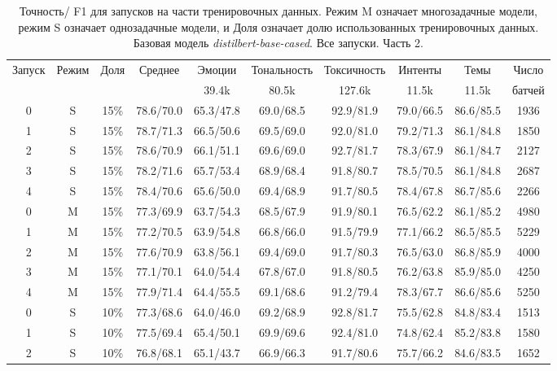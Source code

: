 \begin{table*}
\caption{Точность/ F1 для запусков на части тренировочных данных.  Режим M означает многозадачные модели, режим S означает однозадачные модели, и Доля означает долю использованных тренировочных данных. Базовая модель \textit{distilbert-base-cased}. Все запуски. Часть 2. }%
\label{appendix:model_results2}
\begin{tabular}{|c|c|c||c|c|c|c|c|c||c|} \hline
 \multirow{2}{*}{Запуск} & \multirow{2}{*}{Режим} &  \multirow{2}{*}{Доля} &\multirow{2}{*}{Среднее} & Эмоции & Тональность & Токсичность & Интенты & Темы & Число \\
& & & & 39.4k & 80.5k & 127.6k & 11.5k & 11.5k & батчей \\ \hline \hline
0 & S & 15\% & 78.6/70.0 & 65.3/47.8 & 69.0/68.5 & 92.9/81.9 & 79.0/66.5 & 86.6/85.5 & 1936 \\ \hline
1 & S & 15\% & 78.7/71.3 & 66.5/50.6 & 69.5/69.0 & 92.0/81.0 & 79.2/71.3 & 86.1/84.8 & 1850 \\ \hline
2 & S & 15\% & 78.6/70.9 & 66.1/51.1 & 69.6/69.0 & 92.7/81.7 & 78.3/67.9 & 86.1/84.7 & 2127 \\ \hline
3 & S & 15\% & 78.2/71.6 & 65.7/53.4 & 68.9/68.4 & 91.8/80.7 & 78.5/70.5 & 86.1/84.8 & 2687 \\ \hline
4 & S & 15\% & 78.4/70.6 & 65.6/50.0 & 69.4/68.9 & 91.7/80.5 & 78.4/67.8 & 86.7/85.6 & 2266 \\ \hline
0 & M & 15\% & 77.3/69.9 & 63.7/54.3 & 68.5/67.9 & 91.9/80.1 & 76.5/62.2 & 86.1/85.2 & 4980 \\ \hline
1 & M & 15\% & 77.2/70.5 & 63.9/54.8 & 66.8/66.0 & 91.5/79.9 & 77.1/66.2 & 86.5/85.5 & 5229 \\ \hline
2 & M & 15\% & 77.6/70.9 & 63.8/56.1 & 69.4/69.0 & 91.7/80.3 & 76.5/63.0 & 86.8/85.9 & 4000 \\ \hline
3 & M & 15\% & 77.1/70.1 & 64.0/54.4 & 67.8/67.0 & 91.8/80.5 & 76.2/63.8 & 85.9/85.0 & 4250 \\ \hline
4 & M & 15\% & 77.9/71.4 & 64.4/55.5 & 69.1/68.6 & 91.2/79.4 & 78.3/67.7 & 86.6/85.6 & 5250 \\ \hline
0 & S & 10\% & 77.3/68.6 & 64.0/46.0 & 69.2/68.9 & 92.8/81.7 & 75.5/62.8 & 84.8/83.4 & 1513 \\ \hline
1 & S & 10\% & 77.5/69.4 & 65.4/50.1 & 69.9/69.6 & 92.4/81.0 & 74.8/62.4 & 85.2/83.8 & 1580 \\ \hline
2 & S & 10\% & 76.8/68.1 & 65.1/43.7 & 66.9/66.3 & 91.7/80.6 & 75.7/66.2 & 84.6/83.5 & 1652 \\ \hline

\end{tabular}
\end{table*}
